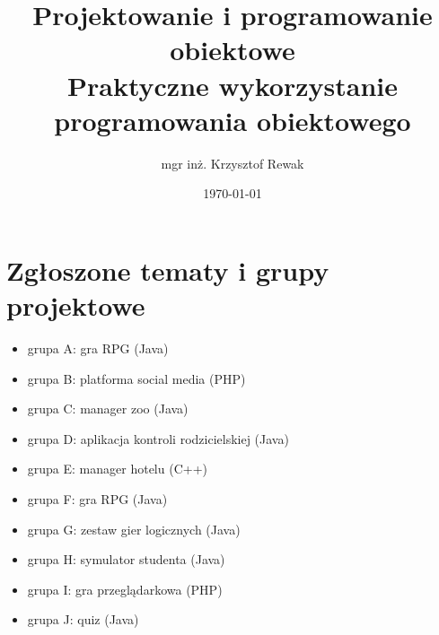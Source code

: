 \documentclass{article}
\title{
	Projektowanie i programowanie obiektowe \\
	\Huge{Praktyczne wykorzystanie programowania obiektowego}
}
\author{mgr inż. Krzysztof Rewak}
\date{\today}
\begin{document}
	\maketitle

	\section*{Zgłoszone tematy i grupy projektowe}	
	\begin{itemize}
		\item grupa A: gra RPG (Java)
		\item grupa B: platforma social media (PHP)
		\item grupa C: manager zoo (Java)
		\item grupa D: aplikacja kontroli rodzicielskiej (Java)
		\item grupa E: manager hotelu (C++)
		\item grupa F: gra RPG (Java)
		\item grupa G: zestaw gier logicznych (Java)
		\item grupa H: symulator studenta (Java)
		\item grupa I: gra przeglądarkowa (PHP)
		\item grupa J: quiz (Java)
	\end{itemize}
\end{document}
